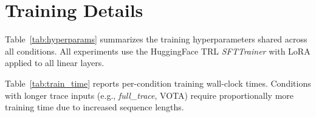 \section{Training Details}
\label{sec:training_details}

Table~\ref{tab:hyperparams} summarizes the training hyperparameters shared across all conditions.
All experiments use the HuggingFace TRL \textit{SFTTrainer} with LoRA \citep{hu2022lora} applied to all linear layers.

\begin{table}[h!]
\centering
\caption{Training hyperparameters (shared across all conditions).}
\label{tab:hyperparams}
\small
{}
\end{table}

Table~\ref{tab:train_time} reports per-condition training wall-clock times.
Conditions with longer trace inputs (e.g., \textit{full\_trace}, VOTA) require proportionally more training time due to increased sequence lengths.

